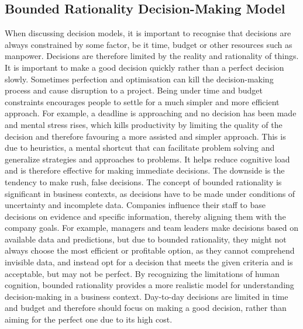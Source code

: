 \subsection{Bounded Rationality Decision-Making Model}
When discussing decision models, it is important to recognise that decisions are always constrained by some factor, be it time, budget or other resources such as manpower. Decisions are therefore limited by the reality and rationality of things. It is important to make a good decision quickly rather than a perfect decision slowly. Sometimes perfection and optimisation can kill the decision-making process and cause disruption to a project. 
\newline \noindent Being under time and budget constraints encourages people to settle for a much simpler and more efficient approach. For example, a deadline is approaching and no decision has been made and mental stress rises, which kills productivity by limiting the quality of the decision and therefore favouring a more assisted and simpler approach. This is due to heuristics, a mental shortcut that can facilitate problem solving and generalize strategies and approaches to problems. It helps reduce cognitive load and is therefore effective for making immediate decisions. The downside is the tendency to make rush, false decisions. 
\newline \noindent  The concept of bounded rationality is significant in business contexts, as decisions have to be made under conditions of uncertainty and incomplete data. Companies influence their staff to base decisions on evidence and specific information, thereby aligning them with the company goals. For example, managers and team leaders make decisions based on available data and predictions, but due to bounded rationality, they might not always choose the most efficient or profitable option, as they cannot comprehend invisible data, and instead opt for a decision that meets the given criteria and is acceptable, but may not be perfect. 
\newline \noindent By recognizing the limitations of human cognition, bounded rationality provides a more realistic model for understanding decision-making in a business context. Day-to-day decisions are limited in time and budget and therefore should focus on making a good decision, rather than aiming for the perfect one due to its high cost. \cite{hernandez_bounded_2019}


